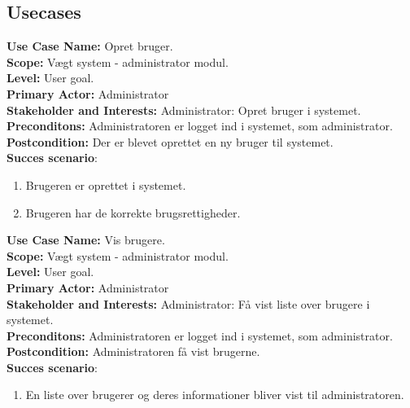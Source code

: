 \subsection{Usecases}
        \textbf{Use Case Name: } Opret bruger. \\
        \textbf{Scope: } Vægt system - administrator modul. \\
        \textbf{Level: } User goal. \\
        \textbf{Primary Actor: } Administrator \\
        \textbf{Stakeholder and Interests: } Administrator: Opret bruger i systemet. \\
        \textbf{Preconditons: }  Administratoren er logget ind i systemet, som administrator. \\
        \textbf{Postcondition: } Der er blevet oprettet en ny bruger til systemet. \\
        \textbf{Succes scenario}:
        \begin{enumerate}
            \item Brugeren er oprettet i systemet.
            \item Brugeren har de korrekte brugsrettigheder. 
        \end{enumerate}
        
        \textbf{Use Case Name: } Vis brugere. \\
        \textbf{Scope: } Vægt system - administrator modul. \\
        \textbf{Level: } User goal. \\
        \textbf{Primary Actor: } Administrator \\
        \textbf{Stakeholder and Interests: } Administrator: Få vist liste over brugere i systemet. \\
        \textbf{Preconditons: }  Administratoren er logget ind i systemet, som administrator. \\
        \textbf{Postcondition: } Administratoren få vist brugerne. \\
        \textbf{Succes scenario}:
        \begin{enumerate}
            \item En liste over brugerer og deres informationer bliver vist til administratoren.
        \end{enumerate}
        
